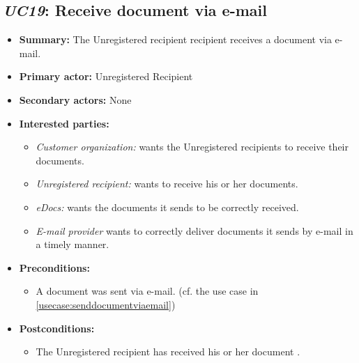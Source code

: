 \documentclass[a4paper,10pt]{article}
\begin{document}
\subsection{\emph{UC19}: Receive document via e-mail}
\begin{itemize}
    \item \textbf{Summary:} The Unregistered recipient recipient receives a document via e-mail.
    \item \textbf{Primary actor:} Unregistered Recipient
	\item \textbf{Secondary actors:} None
    \item \textbf{Interested parties:} 
        \begin{itemize}
            \item \textit{Customer organization:} wants the Unregistered recipients to receive their documents.
            \item \textit{Unregistered recipient:} wants to receive his or her documents.
            \item \textit{eDocs:} wants the documents it sends to be correctly received.
            \item \textit{E-mail provider} wants to correctly deliver documents it sends by e-mail in a timely manner.
        \end{itemize}

    \item \textbf{Preconditions:}
        \begin{itemize}
            \item A document was sent via e-mail. (cf. the use case in \ref{usecase:senddocumentviaemail})
        \end{itemize}

    \item \textbf{Postconditions:}
        \begin{itemize}
            \item The Unregistered recipient has received his or her document .
        \end{itemize}
        

\end{itemize}
\end{document}
